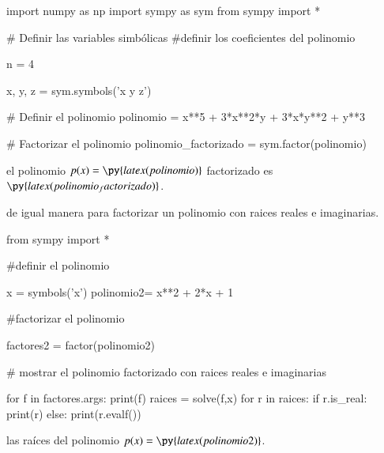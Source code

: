 \documentclass[a4paper]{article}
\begin{document}
    \begin{pycode}
import numpy as np
import sympy as sym
from sympy import *

# Definir las variables simbólicas
#definir los coeficientes del polinomio


n = 4

x, y, z = sym.symbols('x y z')

# Definir el polinomio
polinomio = x**5 + 3*x**2*y + 3*x*y**2 + y**3

# Factorizar el polinomio
polinomio_factorizado = sym.factor(polinomio)

\end{pycode}

el polinomio $p(x)=\py{latex(polinomio)}$ factorizado es $\py{latex(polinomio_factorizado)}$.

de igual manera para factorizar un polinomio con raices reales e imaginarias.

\begin{pycode}
from sympy import *

#definir el polinomio

x = symbols('x')
polinomio2= x**2 + 2*x + 1

#factorizar el polinomio

factores2 = factor(polinomio2)

# mostrar el polinomio factorizado con raices reales e imaginarias

for f in factores.args:
      print(f)
      raices = solve(f,x)
      for r in raices:
	if r.is_real:
		print(r)
	else:
		print(r.evalf())
\end{pycode}

las raíces del polinomio $p(x)=\py{latex(polinomio2)}$.
\end{document}

